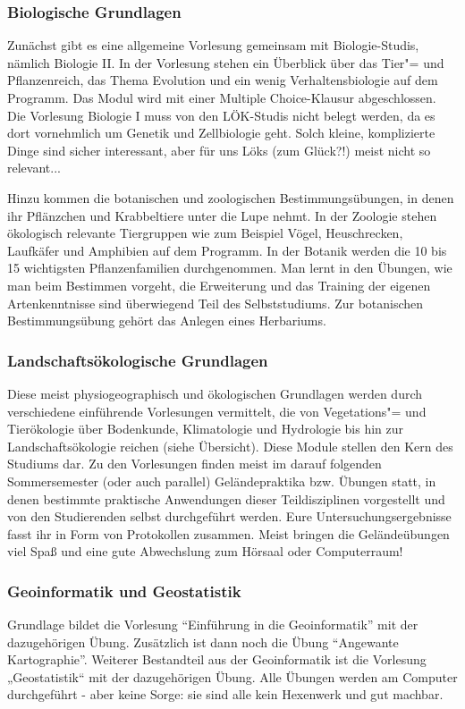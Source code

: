 \subsubsection{Biologische Grundlagen}
Zunächst gibt es eine allgemeine Vorlesung gemeinsam mit Biologie-Studis, nämlich Biologie II. In der Vorlesung stehen ein Überblick über das Tier"= und Pflanzenreich, das Thema Evolution und ein wenig Verhaltensbiologie auf dem Programm. Das Modul wird mit einer Multiple Choice-Klausur abgeschlossen. Die Vorlesung Biologie I muss von den LÖK-Studis nicht belegt werden, da es dort vornehmlich um Genetik und Zellbiologie geht. Solch kleine, komplizierte Dinge sind sicher interessant, aber für uns Löks (zum Glück?!) meist nicht so relevant...

Hinzu kommen die botanischen und zoologischen Bestimmungsübungen, in denen ihr Pflänzchen und Krabbeltiere unter die Lupe nehmt. In der Zoologie stehen ökologisch relevante Tiergruppen wie zum Beispiel Vögel, Heuschrecken, Laufkäfer und Amphibien auf dem Programm. In der Botanik werden die 10 bis 15 wichtigsten Pflanzenfamilien durchgenommen. Man lernt in den Übungen, wie man beim Bestimmen vorgeht, die Erweiterung und das Training der eigenen Artenkenntnisse sind überwiegend Teil des Selbststudiums. Zur botanischen Bestimmungsübung gehört das Anlegen eines Herbariums.

\subsubsection*{Landschaftsökologische Grundlagen}
Diese meist physiogeographisch und ökologischen Grundlagen werden durch verschiedene einführende Vorlesungen vermittelt, die von Vegetations"= und Tierökologie über Bodenkunde, Klimatologie und Hydrologie bis hin zur Landschaftsökologie reichen (siehe Übersicht). Diese Module stellen den Kern des Studiums dar. Zu den Vorlesungen ﬁnden meist im darauf folgenden Sommersemester (oder auch parallel) Geländepraktika bzw. Übungen statt, in denen bestimmte praktische Anwendungen dieser Teildisziplinen vorgestellt und von den Studierenden selbst durchgeführt werden. Eure Untersuchungsergebnisse fasst ihr in Form von Protokollen zusammen. Meist bringen die Geländeübungen viel Spaß und eine gute Abwechslung zum Hörsaal oder Computerraum!

\subsubsection*{Geoinformatik und Geostatistik}
Grundlage bildet die Vorlesung \enquote{Einführung in die Geoinformatik} mit der dazugehörigen Übung. Zusätzlich ist dann noch die Übung \enquote{Angewante Kartographie}. Weiterer Bestandteil aus der Geoinformatik ist die Vorlesung „Geostatistik“ mit der dazugehörigen Übung. Alle Übungen werden am Computer durchgeführt - aber keine Sorge: sie sind alle kein Hexenwerk und gut machbar.

